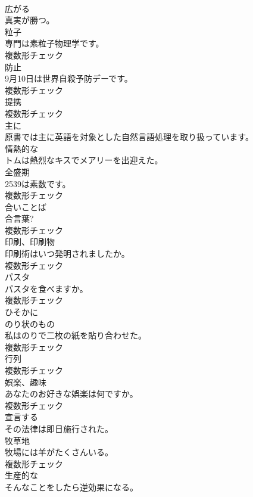 \documentclass[8pt]{extreport}
\begin{document}
\begin{CJK}{UTF8}{min}
\\	[動詞]	広がる	
\\	真実が勝つ。	
\\	[名詞]	粒子	
\\	専門は素粒子物理学です。	
\\	複数形チェック
\\	[名詞]	防止	
\\	9月10日は世界自殺予防デーです。	
\\	複数形チェック
\\	[名詞]	提携	
\\	複数形チェック
\\	[副詞]	主に	
\\	原書では主に英語を対象とした自然言語処理を取り扱っています。	
\\	[形容詞]	情熱的な	
\\	トムは熱烈なキスでメアリーを出迎えた。	
\\	[名詞]	全盛期	
\\	2539は素数です。	
\\	複数形チェック
\\	[名詞]	合いことば	
\\	合言葉?	
\\	複数形チェック
\\	[名詞]	印刷、印刷物	
\\	印刷術はいつ発明されましたか。	
\\	複数形チェック
\\	[名詞]	パスタ	
\\	パスタを食べますか。	
\\	複数形チェック
\\	[副詞]	ひそかに	
\\	[名詞]	のり状のもの	
\\	私はのりで二枚の紙を貼り合わせた。	
\\	複数形チェック
\\	[名詞]	行列	
\\	複数形チェック
\\	[名詞]	娯楽、趣味	
\\	あなたのお好きな娯楽は何ですか。	
\\	複数形チェック
\\	[動詞]	宣言する	
\\	その法律は即日施行された。	
\\	[名詞]	牧草地	
\\	牧場には羊がたくさんいる。	
\\	複数形チェック
\\	[形容詞]	生産的な	
\\	そんなことをしたら逆効果になる。	

\end{CJK}
\end{document}

